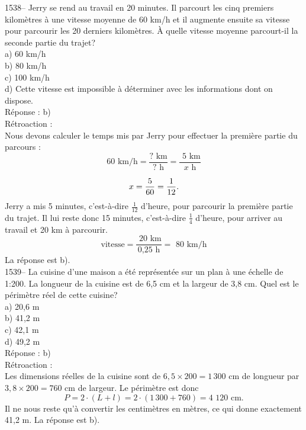 1538-- Jerry se rend au travail en 20 minutes. Il parcourt les cinq
premiers kilom\`etres \`a une vitesse moyenne de 60 km/h et il
augmente ensuite sa vitesse pour parcourir les 20 derniers
kilom\`etres. \`A quelle vitesse
moyenne parcourt-il la seconde partie du trajet?\\
a) 60 km/h\\
b) 80 km/h\\
c) 100 km/h\\
d) Cette vitesse est impossible \`a d\'eterminer avec les informations dont
on dispose.\\

R\'eponse : b)\\

R\'etroaction :\\
Nous devons calculer le temps mis par Jerry pour effectuer la
premi\`ere partie du parcours : $$60{\textrm{ km/h}}
=\frac{{\textrm{? km}}}{{\textrm{? h}}}=\frac{{\textrm{ 5 km}}}{{x
\textrm{ h}}}$$


$$x=\frac{5}{60}=\frac{1}{12}.\\[3mm] $$ Jerry a mis 5
minutes, c'est-\`a-dire $\frac{1}{12}$ d'heure, pour parcourir la
premi\`ere partie du trajet. Il lui reste donc 15 minutes,
c'est-\`a-dire $\frac{1}{4}$ d'heure, pour arriver au travail et 20
km \`a parcourir.
$${\textrm{vitesse}}=\frac{\textrm{ 20 km}}{\textrm{0,25 h}}={\textrm{ 80
km/h}}$$
La r\'eponse est b).\\

1539-- La cuisine d'une maison a \'et\'e repr\'esent\'ee sur un plan
\`a une \'echelle de 1:200. La longueur de la cuisine est de 6,5 cm
et la largeur de 3,8 cm. Quel est le p\'erim\`etre r\'eel de
cette cuisine?\\
a) 20,6 m\\
b) 41,2 m \\
c) 42,1 m\\
d) 49,2 m\\

R\'eponse : b)\\

R\'etroaction :\\
Les dimensions r\'eelles de la cuisine sont de $6,5\times
200=1\,300$ cm de longueur par $3,8\times 200=760$ cm de largeur. Le
p\'erim\`etre est donc $$P=2\cdot(L+l)=2\cdot(1\,300+760)={\textrm{
4 120 cm}}.$$ Il ne nous reste qu'\`a convertir les centim\`etres en
m\`etres, ce qui donne exactement 41,2
m. La r\'eponse est b).\\


